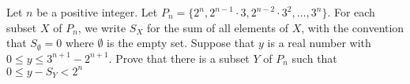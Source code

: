 Let $n$ be a positive integer. Let $P_n=\{2^n,2^{n-1}\cdot 3, 2^{n-2}\cdot 3^2, \dots, 3^n \}.$ For each subset $X$ of $P_n$, we write $S_X$ for the sum of all elements of $X$, with the convention that $S_{\emptyset}=0$ where $\emptyset$ is the empty set. Suppose that $y$ is a real number with $0 \leq y \leq 3^{n+1}-2^{n+1}.$
Prove that there is a subset $Y$ of $P_n$ such that  $0 \leq y-S_Y < 2^n$